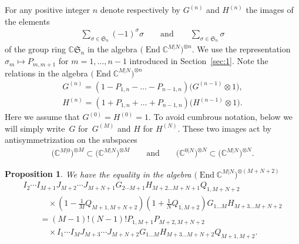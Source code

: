 \documentclass[10pt,a4paper]{amsart}
\numberwithin{equation}{section}
\newtheorem{Proposition}[Theorem]{Proposition}
\def\CC{{\mathbb{C}}}
\def\CMN{\CC^{M|N}}
\def\End{\operatorname{End}}
\def\ot{\otimes}
\def\si{\sigma}
\def\Sym{\mathfrak{S}}
\begin{document}
For any positive integer $n$ denote respectively by
$G^{(n)}$ and $H^{(n)}$ the images of the elements
\begin{gather*}
\sum_{\si\in\Sym_n}(-1)^\si \si
\qquad\text{and}\qquad
\sum_{\si\in\Sym_n}\si
\end{gather*}
of the group ring $\CC \Sym_n$
in the algebra
$\big(\End\CMN\big)^{\ot n} $.
We use the representation $\si_m\mapsto P_{m,m+1}$
for $m=1,\dots, n-1$ introduced in Section~\ref{sec:1}.
Note the relations in the algebra
$\big(\End\CMN\big)^{\ot n}$
\begin{gather}\label{GG}
G^{(n)} =(1-P_{1,n}-\dots-P_{n-1,n}) \big(G^{(n-1)}\ot1\big) ,\\
\label{HH}
H^{(n)} =(1+P_{1,n}+\dots+P_{n-1,n}) \big(H^{(n-1)}\ot1\big) .
\end{gather}
Here we assume that $G^{(0)}=H^{(0)}=1 $.
To avoid cumbrous notation, below we will simply write~$G$ for~$G^{(M)}$ and $H$ for $H^{(N)} $.
These two images act by antisymmetrization on the subspaces
\begin{gather}\label{SS}
\big(\CC^{M| 0}\big)^{\ot M}\subset\big(\CMN\big)^{\ot M}
\qquad\text{and}\qquad
\big(\CC^{0 |N}\big)^{\ot N}\subset\big(\CMN\big)^{\ot N} .
\end{gather}

\begin{Proposition}\label{L1}
We have the equality in the algebra
$\big(\End\CMN\big)^{\ot (M+N+2)}$
\begin{gather*}
 I_{2} \cdots I_{M+1}
J_{M+2} \cdots J_{M+N+1}
G_{2 \cdots M+1} H_{M+2 \dots M+N+1}
Q_{1,M+N+2}\\
\qquad\quad {} \times \left( 1-\frac1M Q_{M+1,M+N+2} \right)
\left( 1+\frac1N Q_{1,M+2} \right)
G_{1 \dots M} H_{M+3 \dots M+N+2} \\
\qquad {}=
(M-1) ! (N-1) !P_{1,M+1} P_{M+2,M+N+2}\\
\qquad\quad{} \times
I_{1} \cdots I_{M}
J_{M+3} \cdots J_{M+N+2}
G_{1 \dots M} H_{M+3 \dots M+N+2}
Q_{M+1,M+2} .
\end{gather*}
\end{Proposition}
\end{document}

